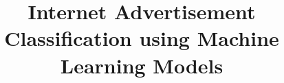 \documentclass[twoside,final]{hcmut-report}
\title{Internet Advertisement Classification using Machine Learning Models}
\begin{document}
\coverpage%


\tableofcontents
\listoffigures
\listoftables
\lstlistoflistings{}

\clearpage



\pagebreak



\pagebreak



\pagebreak



\pagebreak



\pagebreak



\pagebreak



\pagebreak





\clearpage



\nocite{*}
\end{document}
